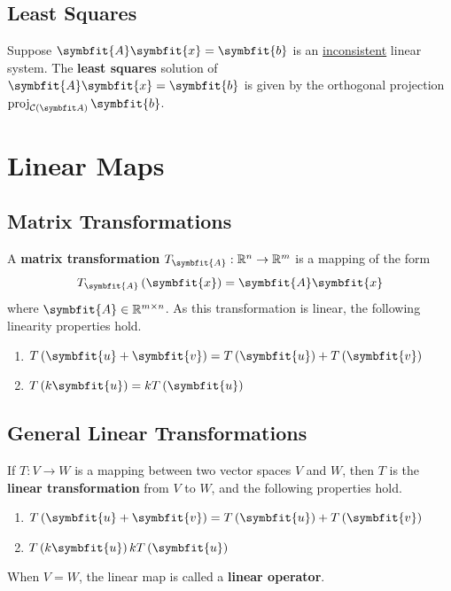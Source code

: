 \documentclass{article}
\begin{document}
	\subsection{Least Squares}
	\begin{theorem}
		Suppose $\symbfit{A}\symbfit{x}=\symbfit{b}$ is an \underline{inconsistent} linear system. The \textbf{least squares} solution of $\symbfit{A}\symbfit{x}=\symbfit{b}$ is given by the orthogonal projection $\proj_{\columnspace{A}}\symbfit{b}$.
	\end{theorem}
	\newpage
\section{Linear Maps}
	\subsection{Matrix Transformations}
	\begin{definition}
		A \textbf{matrix transformation} $T_{\symbfit{A}}:\mathbb{R}^n\rightarrow \mathbb{R}^m$ is a mapping of the form
		\begin{equation*}
			T_{\symbfit{A}}\left(\symbfit{x}\right) = \symbfit{A}\symbfit{x}
		\end{equation*}
		where $\symbfit{A}\in \mathbb{R}^{m \times n}$. As this transformation is linear, the following linearity properties hold.
		\begin{enumerate}
			\item $T\left(\symbfit{u}+\symbfit{v}\right)=T\left(\symbfit{u}\right) + T\left(\symbfit{v}\right)$
			\item $T\left(k\symbfit{u}\right)= kT\left(\symbfit{u}\right)$
		\end{enumerate}
	\end{definition}
	\subsection{General Linear Transformations}
	\begin{theorem}
		If $T: V \rightarrow W$ is a mapping between two vector spaces $V$ and $W$, then $T$ is the \textbf{linear transformation} from $V$ to $W$, and the following properties hold.
		\begin{enumerate}
			\item $T\left(\symbfit{u}+\symbfit{v}\right)=T\left(\symbfit{u}\right) + T\left(\symbfit{v}\right)$
			\item $T\left(k\symbfit{u}\right) kT\left(\symbfit{u}\right)$
		\end{enumerate}
	\end{theorem}
	\begin{theorem}
		When $V=W$, the linear map is called a \textbf{linear operator}.
	\end{theorem}
\end{document}
